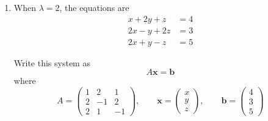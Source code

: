 \documentclass[leqno]{article}
\begin{document}
\begin{enumerate}[
  label=\textbf{\arabic*.},
  leftmargin=*,
  topsep=0pt,
  partopsep=0pt,
  parsep=0pt
]
\begin{tcolorbox}[colback=white, colframe=scarlet, title={\textbf{Solution}}, breakable, grow to left by=6mm, grow to right by=10mm]
\begin{enumerate}[label=\textbf{(\alph*)}]
The three planes meet at a unique point if and only if the simultaneous equations have a unique solution, that is, if and only if $\det A\neq 0$.

Expanding along the first row,
\begin{align*}
\det A
&=1\begin{vmatrix}-1&2\\1&-1\end{vmatrix}
-\lambda\begin{vmatrix}2&2\\2&-1\end{vmatrix}
+1\begin{vmatrix}2&-1\\2&1\end{vmatrix}\\
&=1\bigl((-1)(-1)-2(1)\bigr)
-\lambda\bigl(2(-1)-2(2)\bigr)
+\bigl(2(1)-(-1)(2)\bigr)\\
&=(1-2)-\lambda(-2-4)+(2+2)\\
&=-1+6\lambda+4\\
&=6\lambda+3\\
&=3(2\lambda+1)
\end{align*}

So the planes meet at a unique point whenever
\[
3(2\lambda+1)\neq 0
\]
that is,
\[
\lambda\neq -\frac12
\]

Hence the exceptional value is
\[
\lambda=-\frac12
\]

For $\lambda=-\frac12$, the first plane is
\[
x-\frac12 y+z=4
\]
and multiplying by $2$ gives
\[
2x-y+2z=8
\]
but the second plane is
\[
2x-y+2z=3
\]
so the system is inconsistent. Therefore there is no common point in this case.

Hence the three planes meet at a unique point for all $\lambda$ except $\lambda=-\frac12$.

  \item When $\lambda=2$, the equations are
\[
\begin{aligned}
x+2y+z&=4\\
2x-y+2z&=3\\
2x+y-z&=5
\end{aligned}
\]

Write this system as
\[
A\mathbf{x}=\mathbf{b}
\]
where
\[
A=
\begin{pmatrix}
1&2&1\\
2&-1&2\\
2&1&-1
\end{pmatrix},
\qquad
\mathbf{x}=
\begin{pmatrix}
x\\
y\\
z
\end{pmatrix},
\qquad
\mathbf{b}=
\begin{pmatrix}
4\\
3\\
5
\end{pmatrix}
\]


\end{enumerate}
\end{tcolorbox}
\end{enumerate}
\end{document}
